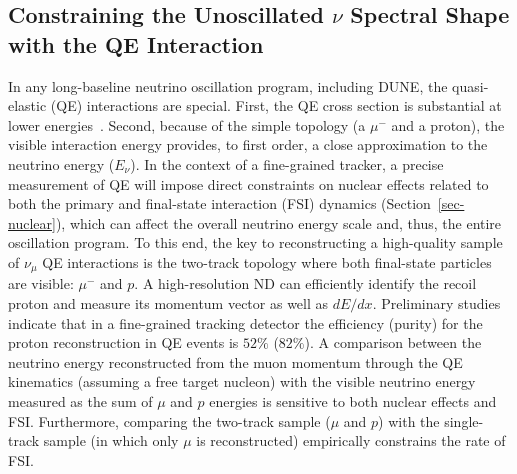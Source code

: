 \subsection{Constraining the Unoscillated $\nu$ %
Spectral Shape with the QE Interaction}

In any long-baseline neutrino oscillation program, including DUNE, the
quasi-elastic (QE) interactions are special.  First, the QE cross
section is substantial at lower energies~\cite{Formaggio:2013kya}.
Second, because of the simple topology (a $\mu^-$ and a proton), the
visible interaction energy provides, to first order, a close
approximation to the neutrino energy ($E_\nu$).  
In the context of a fine-grained tracker, a precise measurement of QE
will impose direct constraints on nuclear effects related to both the
primary and final-state interaction (FSI) dynamics 
(Section~\ref{sec-nuclear}), which can affect the overall neutrino
energy scale and, thus, the entire oscillation program.  To this end,
the key to reconstructing a high-quality sample of $\nu_\mu$ QE
interactions is the two-track topology where both final-state
particles are visible: $\mu^-$ and $p$. A high-resolution ND can
efficiently identify the recoil proton and measure its momentum vector
as well as $dE/dx$. Preliminary studies indicate that in a
fine-grained tracking detector the efficiency (purity) for the proton
reconstruction in QE events is $52\%$ ($82\%$). A comparison between
the neutrino energy reconstructed from the muon momentum through the
QE kinematics (assuming a free target nucleon) with the visible
neutrino energy measured as the sum of $\mu$ and $p$ energies is
sensitive to both nuclear effects and FSI. Furthermore, comparing the
two-track sample ($\mu$ and $p$) with the single-track sample (in which only $\mu$
is reconstructed) empirically constrains the rate of FSI.
